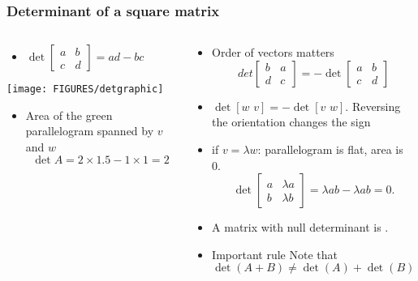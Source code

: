 \documentclass[8pt,dvipsnames]{beamer}
\newcommand{\myemph}[1]{{\color{blue}{#1}}}
\begin{document}
\begin{frame}
  \frametitle{Determinant of a square matrix}
  \begin{columns}
    \begin{column}{0.5\textwidth}
      \begin{itemize}
      \item  $
       \det
       \begin{bmatrix}
         a & b\\ c & d
       \end{bmatrix}
       = ad - bc
       $
      \end{itemize}
       \begin{center}
         \texttt{[image: FIGURES/detgraphic]}  
       \end{center}
       \begin{itemize}
       \item    Area of the green parallelogram spanned by $v$ and $w$    
         $$
         \det A = 2\times 1.5 - 1\times 1 = 2
         $$
       \end{itemize}
     \end{column}
     \begin{column}{0.5\textwidth}
       \begin{itemize}
       \item Order of vectors matters
      $$
       det
       \begin{bmatrix}
         b & a\\ d & c
       \end{bmatrix}
       = - \det
       \begin{bmatrix}
         a & b\\ c & d
       \end{bmatrix}
       $$
     \item $\det [w\,\, v] = -\det[v\,\, w]$.
       Reversing the orientation changes the sign
     \item if $v = \lambda w$: parallelogram is flat, area is 0.
       $$
       \det
       \begin{bmatrix}
         a & \lambda a \\b &\lambda b
       \end{bmatrix}
       = \lambda a b - \lambda a b = 0.
       $$
     \item A matrix with null determinant is \myemph{singular}.
     \item Important rule  
       Note that $\det(A+B) \not= \det(A) + \det(B)$
       \end{itemize}
      \end{column}
  \end{columns}
\end{frame}
\end{document}
